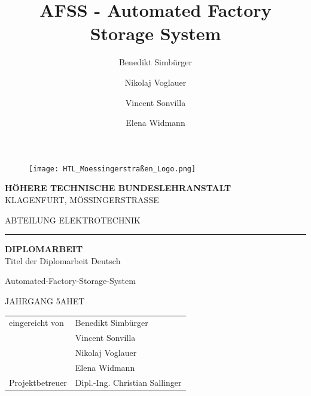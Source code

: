 \documentclass[12pt, twoside]{article}
\title{AFSS - Automated Factory Storage System}
\author{Benedikt Simbürger \\
    \and Nikolaj Voglauer \\
    \and Vincent Sonvilla \\
    \and Elena Widmann
    }
\begin{document}
\sloppy
{}

\setlength{\parindent}{0pt}

\begin{figure}[h]
    \vspace{-5mm}
    \texttt{[image: HTL\_Moessingerstraßen\_Logo.png]}
    \centering
\end{figure}

\begin{center}
    \Large \textbf{HÖHERE TECHNISCHE BUNDESLEHRANSTALT} \\
    \vspace{5mm}
    \Large{KLAGENFURT, MÖSSINGERSTRASSE}

\end{center}

\vspace{7mm}

\begin{center}
    \Large{ABTEILUNG ELEKTROTECHNIK}
\end{center}

\hrule

\vspace{10mm}

\begin{center}
    \Huge \textbf{DIPLOMARBEIT} \\
    \vspace{7mm}
    \huge{Titel der Diplomarbeit Deutsch}

    \vspace{7mm}
    \huge{Automated-Factory-Storage-System}

    \vspace{7mm}
    \Large{JAHRGANG 5AHET}

\end{center}

\vspace{15mm}

\begin{flushleft}
    \linespread{1}
    \bgroup
        \large
        \def\arraystretch{1.5}
        \begin{tabular}{p{5cm}l}
            eingereicht von & Benedikt Simbürger\\
            & Vincent Sonvilla\\
            & Nikolaj Voglauer\\
            & Elena Widmann\\
            Projektbetreuer & Dipl.-Ing. Christian Sallinger
        \end{tabular}
    \egroup
\end{flushleft}
\end{document}
